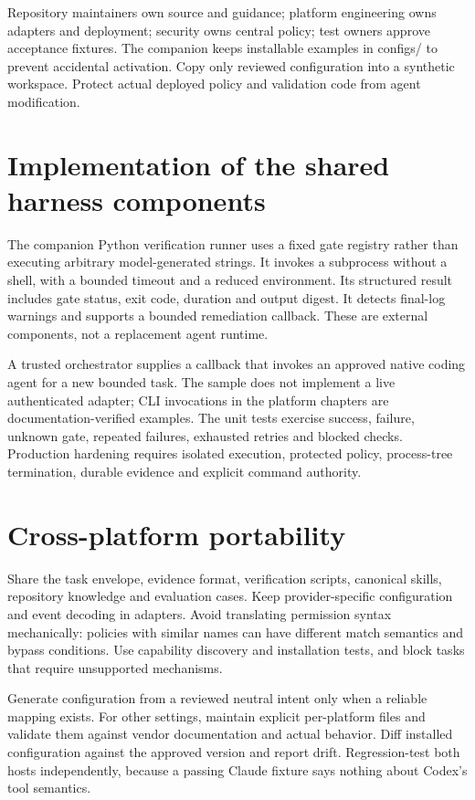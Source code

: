 \documentclass[11pt,letterpaper]{article}
\begin{document}
Repository maintainers own source and guidance; platform engineering owns adapters and deployment; security owns central policy; test owners approve acceptance fixtures. The companion keeps installable examples in configs/ to prevent accidental activation. Copy only reviewed configuration into a synthetic workspace. Protect actual deployed policy and validation code from agent modification.

\section{Implementation of the shared harness components}
The companion Python verification runner uses a fixed gate registry rather than executing arbitrary model-generated strings. It invokes a subprocess without a shell, with a bounded timeout and a reduced environment. Its structured result includes gate status, exit code, duration and output digest. It detects final-log warnings and supports a bounded remediation callback. These are external components, not a replacement agent runtime.

A trusted orchestrator supplies a callback that invokes an approved native coding agent for a new bounded task. The sample does not implement a live authenticated adapter; CLI invocations in the platform chapters are documentation-verified examples. The unit tests exercise success, failure, unknown gate, repeated failures, exhausted retries and blocked checks. Production hardening requires isolated execution, protected policy, process-tree termination, durable evidence and explicit command authority.

\section{Cross-platform portability}
Share the task envelope, evidence format, verification scripts, canonical skills, repository knowledge and evaluation cases. Keep provider-specific configuration and event decoding in adapters. Avoid translating permission syntax mechanically: policies with similar names can have different match semantics and bypass conditions. Use capability discovery and installation tests, and block tasks that require unsupported mechanisms.

Generate configuration from a reviewed neutral intent only when a reliable mapping exists. For other settings, maintain explicit per-platform files and validate them against vendor documentation and actual behavior. Diff installed configuration against the approved version and report drift. Regression-test both hosts independently, because a passing Claude fixture says nothing about Codex's tool semantics.
\end{document}
